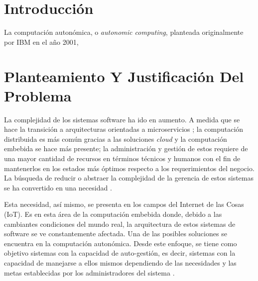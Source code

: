 \documentclass[12pt]{article}
\begin{document}
    
    
    \section{Introducción}


    La computación autonómica, o \textit{autonomic computing}, planteada originalmente por IBM en el año 2001, \cite{jeff_2011}


    \section{Planteamiento Y Justificación Del Problema}
    
    La complejidad de los sistemas software ha ido en aumento. A medida que se hace la transición a arquitecturas orientadas a microservicios \cite{forrester_research_2019}; la computación distribuida es más común gracias a las soluciones \textit{cloud} \cite{the_cloud_in_2021} y la computación embebida se hace más presente;  la administración y gestión de estos requiere de una mayor cantidad de recursos en términos técnicos y humanos con el fin de mantenerlos en los estados más óptimos respecto a los requerimientos del negocio. La búsqueda de reducir o abstraer la complejidad de la gerencia de estos sistemas se ha convertido en una necesidad \cite{lalanda_diaconescu_mccann_2014}.
    
    Esta necesidad, así mismo, se presenta en los campos del Internet de las Cosas (IoT). Es en esta área de la computación embebida donde, debido a las cambiantes condiciones del mundo real, la arquitectura de estos sistemas de software se ve constantemente afectada. Una de las posibles soluciones se encuentra en la computación autonómica. Desde este enfoque, se tiene como objetivo sistemas con la capacidad de auto-gestión, es decir, sistemas con la capacidad de manejarse a ellos mismos dependiendo de las necesidades y las metas establecidas por los administradores del sistema \cite{evaluation_2004}.
    
\end{document}
